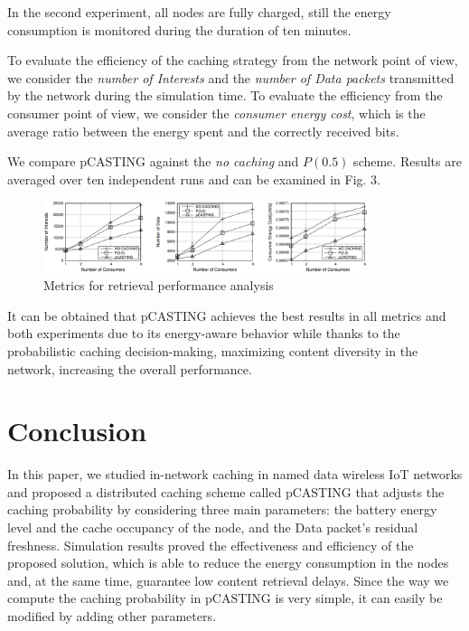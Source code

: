 \documentclass[conference]{IEEEtran}
\begin{document}
In the second experiment, all nodes are fully charged, still the energy consumption is monitored during the
duration of ten minutes.

To evaluate the efficiency of the caching strategy from the network point of view, we consider the \textit{number of Interests} and the 
\textit{number of Data packets} transmitted by the network during the simulation time. To evaluate the efficiency
from the consumer point of view, we consider the \textit{consumer energy cost}, which is the average ratio
between the energy spent and the correctly received bits.

We compare pCASTING against the \textit{no caching} and $P(0.5)$ scheme. Results are averaged over ten independent runs
and can be examined in Fig. 3.

\begin{figure}[htbp]
    \centerline{\includegraphics[width=9.5cm]{fig3.png}}
    \caption{Metrics for retrieval performance analysis}
    \label{fig3}
\end{figure}

It can be obtained that pCASTING achieves the best results in all metrics and both experiments due to its
energy-aware behavior while thanks to the probabilistic caching decision-making, maximizing
content diversity in the network, increasing the overall performance.


\section{Conclusion}
In this paper, we studied in-network caching in named data wireless IoT networks and proposed a distributed caching
scheme called pCASTING that adjusts the caching probability
by considering three main parameters: the battery energy level
and the cache occupancy of the node, and the Data packet's
residual freshness. Simulation results proved the effectiveness
and efficiency of the proposed solution, which is able to reduce
the energy consumption in the nodes and, at the same time,
guarantee low content retrieval delays. Since the way we compute the caching probability in pCASTING
is very simple, it can easily be modified by adding other parameters.

\end{document}
